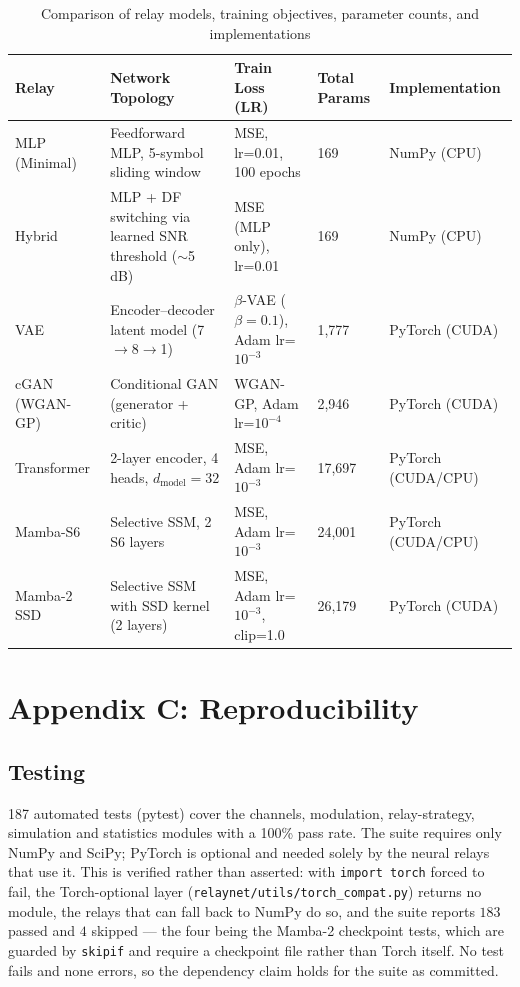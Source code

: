\begin{table}[ht]
\centering
\footnotesize
\setlength{\tabcolsep}{4pt}
\renewcommand{\arraystretch}{1.15}

\begin{tabularx}{\textwidth}{|L{2.1cm}|Y|L{3.2cm}|L{1.7cm}|L{2.3cm}|}
\hline
\textbf{Relay} &
\textbf{Network Topology} &
\textbf{Train Loss (LR)} &
\textbf{Total Params} &
\textbf{Implementation} \\
\hline
MLP (Minimal) &
Feedforward MLP, 5-symbol sliding window &
MSE, lr=0.01, 100 epochs &
169 &
NumPy (CPU) \\
\hline
Hybrid &
MLP + DF switching via learned SNR threshold ($\sim$5 dB) &
MSE (MLP only), lr=0.01 &
169 &
NumPy (CPU) \\
\hline
VAE &
Encoder--decoder latent model (7$\to$8$\to$1) &
$\beta$-VAE ($\beta=0.1$), Adam lr=$10^{-3}$ &
1{,}777 &
PyTorch (CUDA) \\
\hline
cGAN (WGAN-GP) &
Conditional GAN (generator + critic) &
WGAN-GP, Adam lr=$10^{-4}$ &
2{,}946 &
PyTorch (CUDA) \\
\hline
Transformer &
2-layer encoder, 4 heads, $d_{\text{model}}=32$ &
MSE, Adam lr=$10^{-3}$ &
17{,}697 &
PyTorch (CUDA/CPU) \\
\hline
Mamba-S6 &
Selective SSM, 2 S6 layers &
MSE, Adam lr=$10^{-3}$ &
24{,}001 &
PyTorch (CUDA/CPU) \\
\hline
Mamba-2 SSD &
Selective SSM with SSD kernel (2 layers) &
MSE, Adam lr=$10^{-3}$, clip=1.0 &
26{,}179 &
PyTorch (CUDA) \\
\hline
\end{tabularx}

\caption[Relay models, objectives and parameter counts]{Comparison of relay models, training objectives, parameter counts, and implementations}
\label{tab:relay_comparison}
\end{table}

\section{Appendix C: Reproducibility}\label{sec:appendix-c-software-architecture}

\subsection{Testing} 187 automated tests (pytest) cover the channels, modulation, relay-strategy, simulation and statistics modules with a 100\% pass rate. The suite requires only NumPy and SciPy; PyTorch is optional and needed solely by the neural relays that use it. This is verified rather than asserted: with \texttt{import torch} forced to fail, the Torch-optional layer (\texttt{relaynet/utils/torch\_compat.py}) returns no module, the relays that can fall back to NumPy do so, and the suite reports $183$ passed and $4$ skipped --- the four being the Mamba-2 checkpoint tests, which are guarded by \texttt{skipif} and require a checkpoint file rather than Torch itself. No test fails and none errors, so the dependency claim holds for the suite as committed.

